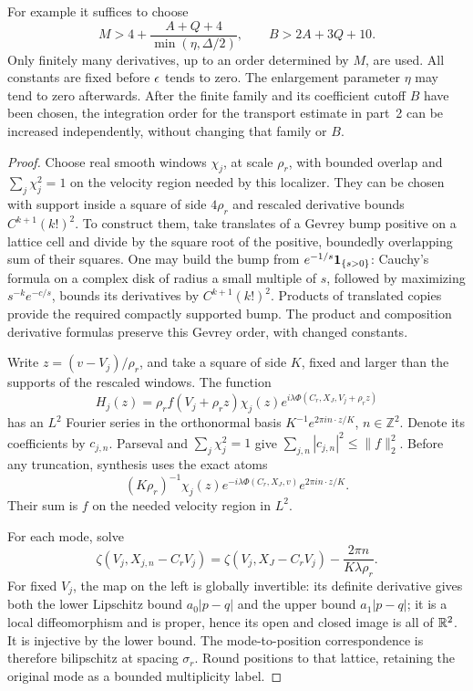 \begin{lemma}
For example it suffices to choose
\begin{equation}
 M>4+\frac{A+Q+4}{\min(\eta,\Delta/2)},\qquad
 B>2A+3Q+10.
 \label{eq:packet-tail-orders}
\end{equation}
Only finitely many derivatives, up to an order determined by \(M\),
are used.  All constants are fixed before \(\epsilon\) tends to zero.
The enlargement parameter \(\eta\) may tend to zero afterwards.
After the finite family and its coefficient cutoff \(B\) have been
chosen, the integration order for the transport estimate in part~2
can be increased independently, without changing that family or \(B\).
\end{lemma}

\begin{proof}
Choose real smooth windows \(\chi_j\), at scale \(\rho_r\), with
bounded overlap and \(\sum_j\chi_j^2=1\) on the velocity region
needed by this localizer.  They can be chosen with support inside
a square of side \(4\rho_r\) and rescaled derivative bounds
\(C^{k+1}(k!)^2\).  To construct them, take translates of a
Gevrey bump positive on a lattice cell and divide by the square root
of the positive, boundedly overlapping sum of their squares.
One may build the bump from \(e^{-1/s}\mathbf 1_{\{s>0\}}\): Cauchy's
formula on a complex disk of radius a small multiple of \(s\),
followed by maximizing \(s^{-k}e^{-c/s}\), bounds its derivatives
by \(C^{k+1}(k!)^2\).  Products of translated copies provide the
required compactly supported bump.
The product and composition derivative formulas preserve this
Gevrey order, with changed constants.

Write \(z=(v-V_j)/\rho_r\), and take a square of side \(K\), fixed
and larger than the supports of the rescaled windows.  The function
\[
 H_j(z)=\rho_r f(V_j+\rho_r z)\chi_j(z)
              e^{i\lambda\Phi(C_r,X_J,V_j+\rho_r z)}
\]
has an \(L^2\) Fourier series in the orthonormal basis
\(K^{-1}e^{2\pi i n\cdot z/K}\), \(n\in\mathbb Z^2\).
Denote its coefficients by \(c_{j,n}\).  Parseval and
\(\sum_j\chi_j^2=1\) give
\(\sum_{j,n}|c_{j,n}|^2\le\|f\|_2^2\).
Before any truncation, synthesis uses the exact atoms
\begin{equation}
 (K\rho_r)^{-1}\chi_j(z)
 e^{-i\lambda\Phi(C_r,X_J,v)}e^{2\pi i n\cdot z/K}.
 \label{eq:packet-linear-fourier-atoms}
\end{equation}
Their sum is \(f\) on the needed velocity region in \(L^2\).

For each mode, solve
\begin{equation}
 \zeta(V_j,X_{j,n}-C_rV_j)
 =\zeta(V_j,X_J-C_rV_j)-\frac{2\pi n}{K\lambda\rho_r}.
 \label{eq:packet-gradient-matching}
\end{equation}
For fixed \(V_j\), the map on the left is globally invertible:
its definite derivative gives both the lower Lipschitz bound
\(a_0|p-q|\) and the upper bound \(a_1|p-q|\); it is a local
diffeomorphism and is proper, hence its open and closed image is
all of \(\mathbb R^2\).  It is injective by the lower bound.
The mode-to-position correspondence is therefore bilipschitz at
spacing \(\sigma_r\).  Round positions to that lattice, retaining
the original mode as a bounded multiplicity label.


\end{proof}
